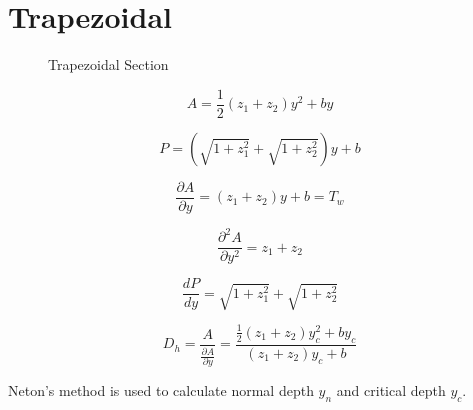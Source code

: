 \section{Trapezoidal}
\begin{figure}[h]
\centering
{}
\caption{Trapezoidal Section}
\end{figure}

\begin{equation}
A = \frac{1}{2} (z_1 + z_2) y^2 + by
\end{equation}

\begin{equation}
P = \left(\sqrt{1+z_1^2} + \sqrt{1+z_2^2}\right)y + b
\end{equation}

\begin{equation}
\frac{\partial A}{\partial y} = (z_1 + z_2)y + b = T_w
\end{equation}

\begin{equation}
\frac{\partial ^2A}{\partial y^2} = z_1 + z_2
\end{equation}

\begin{equation}
\frac{dP}{dy} = \sqrt{1+z_1^2} + \sqrt{1+z_2^2}
\end{equation}

\begin{equation}
D_h = \frac{A}{\frac{\partial A}{\partial y}} = \frac{ \frac{1}{2} (z_1 + z_2) y_c^2 + by_c}{(z_1 + z_2)y_c + b}
\end{equation}

\noindent Neton's method is used to calculate normal depth $y_n$ and critical depth $y_c$.